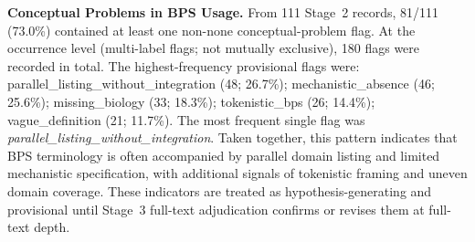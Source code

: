 \noindent\textbf{Conceptual Problems in BPS Usage.} From 111 Stage~2 records, 81/111 (73.0\%) contained at least one non-none conceptual-problem flag. At the occurrence level (multi-label flags; not mutually exclusive), 180 flags were recorded in total. The highest-frequency provisional flags were: parallel\_listing\_without\_integration (48; 26.7\%); mechanistic\_absence (46; 25.6\%); missing\_biology (33; 18.3\%); tokenistic\_bps (26; 14.4\%); vague\_definition (21; 11.7\%). The most frequent single flag was \textit{parallel\_listing\_without\_integration}. Taken together, this pattern indicates that BPS terminology is often accompanied by parallel domain listing and limited mechanistic specification, with additional signals of tokenistic framing and uneven domain coverage. These indicators are treated as hypothesis-generating and provisional until Stage~3 full-text adjudication confirms or revises them at full-text depth.
